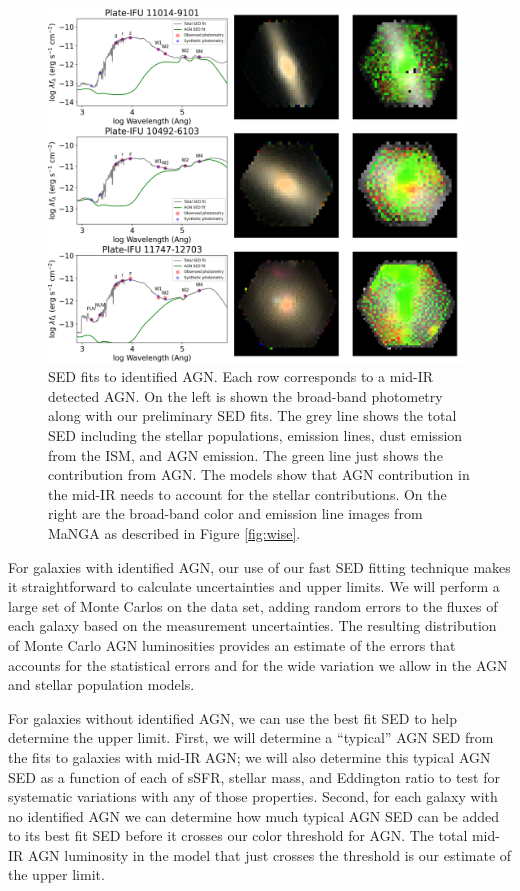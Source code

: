\documentclass[12pt, preprint]{hacked-aastex}
\begin{document}
\begin{figure}[t!]
\includegraphics[width=0.98\textwidth]{spec-grid.png}
    \caption{
\label{fig:fits} \small SED fits to identified AGN. Each row
corresponds to a mid-IR detected AGN. On the left is shown the
broad-band photometry along with our preliminary SED fits.  The grey
line shows the total SED including the stellar populations, emission
lines, dust emission from the ISM, and AGN emission. The green line
just shows the contribution from AGN. The models show that AGN
contribution in the mid-IR needs to account for the stellar
contributions. On the right are the broad-band color and emission line
images from MaNGA as described in Figure \ref{fig:wise}.}
\end{figure}

For galaxies with identified AGN, our use of our fast SED fitting
technique makes it straightforward to calculate uncertainties and
upper limits. We will perform a large set of Monte Carlos on the data
set, adding random errors to the fluxes of each galaxy based on the
measurement uncertainties. The resulting distribution of Monte Carlo
AGN luminosities provides an estimate of the errors that accounts for
the statistical errors and for the wide variation we allow in the AGN
and stellar population models.

For galaxies without identified AGN, we can use the best fit SED to
help determine the upper limit. First, we will determine a ``typical''
AGN SED from the fits to galaxies with mid-IR AGN; we will also
determine this typical AGN SED as a function of each of sSFR, stellar
mass, and Eddington ratio to test for systematic variations with any
of those properties. Second, for each galaxy with no identified AGN we
can determine how much typical AGN SED can be added to its best fit
SED before it crosses our color threshold for AGN. The total mid-IR
AGN luminosity in the model that just crosses the threshold is our
estimate of the upper limit.
\end{document}
